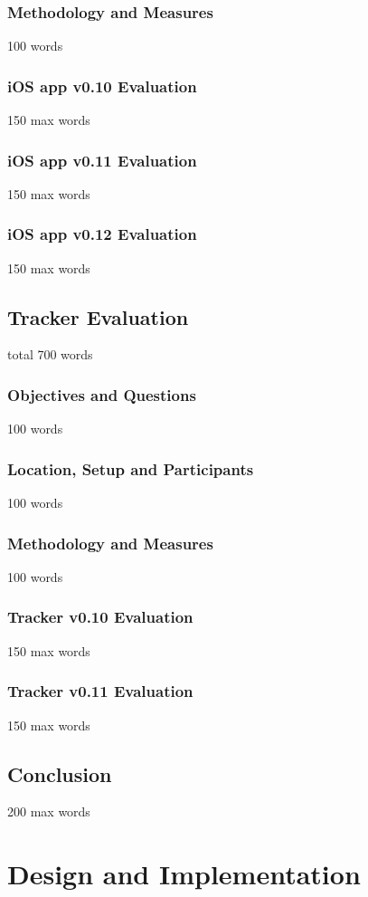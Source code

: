 \documentclass[12pt,a4paper]{article}
\begin{document}
        \subsubsection{Methodology and Measures}
          100 words
        \subsubsection{iOS app v0.10 Evaluation}
          150 max words
        \subsubsection{iOS app v0.11 Evaluation}
          150 max words
        \subsubsection{iOS app v0.12 Evaluation}
          150 max words
      \subsection{Tracker Evaluation}
          total 700 words
        \subsubsection{Objectives and Questions}
          100 words
        \subsubsection{Location, Setup and Participants}
          100 words
        \subsubsection{Methodology and Measures}
          100 words
        \subsubsection{Tracker v0.10 Evaluation}
          150 max words
        \subsubsection{Tracker v0.11 Evaluation}
          150 max words
      \subsection{Conclusion}
        200 max words
    \section{Design and Implementation}
\end{document}
